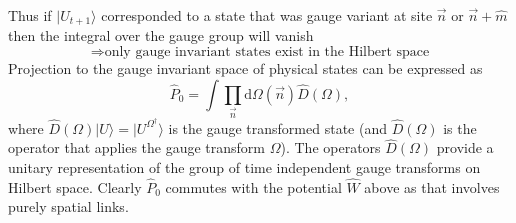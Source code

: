 \begin{itemize}
\begin{itemize}
      Thus if $|U_{t+1}\rangle$ corresponded to a state that was gauge variant at site $\vec{n}$ or $\vec{n} + \hat{m}$ then the integral over the gauge group will vanish
      \begin{equation}
          \Rightarrow \text{only gauge invariant states exist in the Hilbert space}\nonumber
      \end{equation}
      Projection to the gauge invariant space of physical states can be expressed as 
      \begin{equation}
          \hat{P}_0 = \int \prod_{\vec{n}}\text{d}\Omega(\vec{n}) \hat{D}(\Omega),
      \end{equation}
      where $\hat{D}(\Omega)|U\rangle = |U^{\Omega^\dagger}\rangle$ is the gauge transformed state (and $\hat{D}(\Omega)$ is the operator that applies the gauge transform $\Omega$). The operators $\hat{D}(\Omega)$ provide a unitary representation of the group of time independent gauge transforms on Hilbert space. Clearly $\hat{P}_0$ commutes with the potential $\hat{W}$ above as that involves purely spatial links. 


\end{itemize}
\end{itemize}
